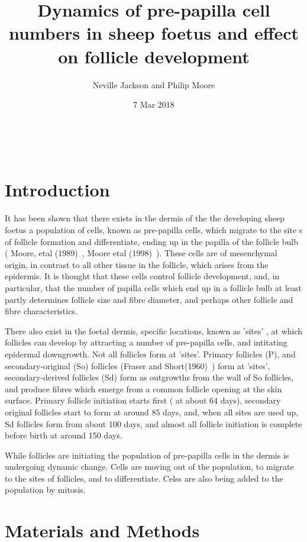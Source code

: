 \documentclass[titlepage]{article}  %
\title{Dynamics of pre-papilla cell numbers in sheep foetus and effect on follicle development}
\author{Neville Jackson and Philip Moore}
\date{7 Mar 2018}
\begin{document}
 


 
\maketitle      
\tableofcontents

$\newcommand{\E}{\mathrm{E}}$
$\newcommand{\Var}{\mathrm{Var}}$
$\newcommand{\Cov}{\mathrm{Cov}}$ 
$\newcommand{\SD}{\mathrm{SD}}$ 

\clearpage
\section{Introduction} 
It has been shown that there  exists in the dermis of the the developing sheep foetus a population of cells, known as pre-papilla cells, which migrate to the site s of follicle formation and differentiate, ending up in the papilla of the follicle bulb ( Moore, etal (1989)~\cite{moor:89}, Moore etal (1998)~\cite{moor:98}). These cells are of mesenchymal origin, in contrast to all other tissue in the follicle, which arises from the epidermis. It is thought that these cells control follicle development, and, in particular, that the number of papilla cells which end up in a follicle bulb  at least partly determines follicle size and fibre diameter, and perhaps other follicle and fibre characteristics.

There also exist in the foetal dermis, specific locations, known as 'sites' , at which follicles can develop by attracting a number of pre-papilla cells, and intitating epidermal downgrowth. Not all follicles form at 'sites'. Primary follicles (P), and secondary-original (So) follicles (Fraser and Short(1960)~\cite{fras:60}) form at 'sites', secondary-derived follicles (Sd) form as outgrowths from the wall of So follicles, and produce fibres which emerge from a common follicle opening at the skin surface. Primary follicle initiation starts first ( at about 64 days), secondary original follicles start to form at around 85 days, and, when all sites are used up, Sd follicles form from about 100 days, and almost all follicle initiation is complete before birth at around 150 days. 

While follicles are initiating the population of pre-papilla cells in the dermis is undergoing dynamic change. Cells are moving out of the population, to migrate to the sites of follicles, and to differentiate. Celss are also being added to the population by mitosis.

\section{Materials and Methods}
\end{document}
